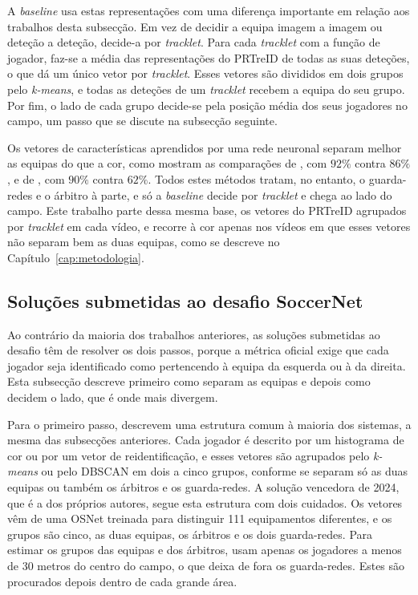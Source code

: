 A \emph{baseline} \citep{somers2024soccernet} usa estas representações com uma diferença importante em relação aos trabalhos desta subsecção. Em vez de decidir a equipa imagem a imagem ou deteção a deteção, decide-a por \emph{tracklet}. Para cada \emph{tracklet} com a função de jogador, faz-se a média das representações do PRTreID de todas as suas deteções, o que dá um único vetor por \emph{tracklet}. Esses vetores são divididos em dois grupos pelo \emph{k-means}, e todas as deteções de um \emph{tracklet} recebem a equipa do seu grupo. Por fim, o lado de cada grupo decide-se pela posição média dos seus jogadores no campo, um passo que se discute na subsecção seguinte.

Os vetores de características aprendidos por uma rede neuronal separam melhor as equipas do que a cor, como mostram as comparações de \citet{alhejaily2023team}, com $92\%$ contra $86\%$, e de \citet{istasse2019associative}, com $90\%$ contra $62\%$. Todos estes métodos tratam, no entanto, o guarda-redes e o árbitro à parte, e só a \emph{baseline} decide por \emph{tracklet} e chega ao lado do campo. Este trabalho parte dessa mesma base, os vetores do PRTreID agrupados por \emph{tracklet} em cada vídeo, e recorre à cor apenas nos vídeos em que esses vetores não separam bem as duas equipas, como se descreve no Capítulo~\ref{cap:metodologia}.

\subsection{Soluções submetidas ao desafio SoccerNet}\label{sec:equipa-desafio}

Ao contrário da maioria dos trabalhos anteriores, as soluções submetidas ao desafio têm de resolver os dois passos, porque a métrica oficial exige que cada jogador seja identificado como pertencendo à equipa da esquerda ou à da direita. Esta subsecção descreve primeiro como separam as equipas e depois como decidem o lado, que é onde mais divergem.

Para o primeiro passo, \citet{golovkin2025minimap} descrevem uma estrutura comum à maioria dos sistemas, a mesma das subsecções anteriores. Cada jogador é descrito por um histograma de cor ou por um vetor de reidentificação, e esses vetores são agrupados pelo \emph{k-means} ou pelo DBSCAN em dois a cinco grupos, conforme se separam só as duas equipas ou também os árbitros e os guarda-redes. A solução vencedora de 2024, que é a dos próprios autores, segue esta estrutura com dois cuidados. Os vetores vêm de uma OSNet treinada para distinguir 111 equipamentos diferentes, e os grupos são cinco, as duas equipas, os árbitros e os dois guarda-redes. Para estimar os grupos das equipas e dos árbitros, usam apenas os jogadores a menos de 30 metros do centro do campo, o que deixa de fora os guarda-redes. Estes são procurados depois dentro de cada grande área.

